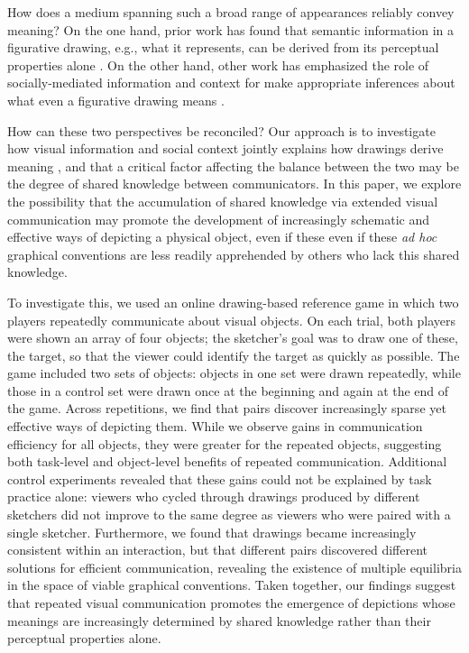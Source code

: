 \documentclass[10pt,letterpaper]{article}
\begin{document}
How does a medium spanning such a broad range of appearances reliably convey meaning? 
On the one hand, prior work has found that semantic information in a figurative drawing, e.g., what it represents, can be derived from its perceptual properties alone \cite{FanCommon2018,sayim2011line}. 
On the other hand, other work has emphasized the role of socially-mediated information and context for make appropriate inferences about what even a figurative drawing means \cite{goodman1976languages,gombrich1969art,garrod_foundations_2007}.

How can these two perspectives be reconciled? 
Our approach is to investigate how visual information and social context jointly explains how drawings derive meaning \cite{fan2018modeling}, and that a critical factor affecting the balance between the two may be the degree of shared knowledge between communicators. 
In this paper, we explore the possibility that the accumulation of shared knowledge via extended visual communication may promote the development of increasingly schematic and effective ways of depicting a physical object, even if these even if these \textit{ad hoc} graphical conventions are less readily apprehended by others who lack this shared knowledge. 


To investigate this, we used an online drawing-based reference game in which two players repeatedly communicate about visual objects. 
On each trial, both players were shown an array of four objects; the sketcher’s goal was to draw one of these, the target, so that the viewer could identify the target as quickly as possible. 
The game included two sets of objects: objects in one set were drawn repeatedly, while those in a control set were drawn once at the beginning and again at the end of the game. 
Across repetitions, we find that pairs discover increasingly sparse yet effective ways of depicting them. 
While we observe gains in communication efficiency for all objects, they were greater for the repeated objects, suggesting both task-level and object-level benefits of repeated communication. 
Additional control experiments revealed that these gains could not be explained by task practice alone: viewers who cycled through drawings produced by different sketchers did not improve to the same degree as viewers who were paired with a single sketcher. 
Furthermore, we found that drawings became increasingly consistent within an interaction, but that different pairs discovered different solutions for efficient communication, revealing the existence of multiple equilibria in the space of viable graphical conventions. 
Taken together, our findings suggest that repeated visual communication promotes the emergence of depictions whose meanings are increasingly determined by shared knowledge rather than their perceptual properties alone.
\end{document}
